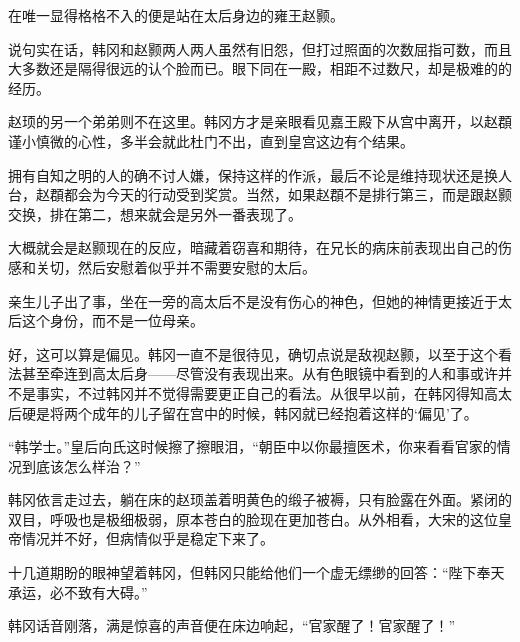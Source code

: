 在唯一显得格格不入的便是站在太后身边的雍王赵颢。

说句实在话，韩冈和赵颢两人两人虽然有旧怨，但打过照面的次数屈指可数，而且大多数还是隔得很远的认个脸而已。眼下同在一殿，相距不过数尺，却是极难的的经历。

赵顼的另一个弟弟则不在这里。韩冈方才是亲眼看见嘉王殿下从宫中离开，以赵頵谨小慎微的心性，多半会就此杜门不出，直到皇宫这边有个结果。

拥有自知之明的人的确不讨人嫌，保持这样的作派，最后不论是维持现状还是换人台，赵頵都会为今天的行动受到奖赏。当然，如果赵頵不是排行第三，而是跟赵颢交换，排在第二，想来就会是另外一番表现了。

大概就会是赵颢现在的反应，暗藏着窃喜和期待，在兄长的病床前表现出自己的伤感和关切，然后安慰着似乎并不需要安慰的太后。

亲生儿子出了事，坐在一旁的高太后不是没有伤心的神色，但她的神情更接近于太后这个身份，而不是一位母亲。

好，这可以算是偏见。韩冈一直不是很待见，确切点说是敌视赵颢，以至于这个看法甚至牵连到高太后身——尽管没有表现出来。从有色眼镜中看到的人和事或许并不是事实，不过韩冈并不觉得需要更正自己的看法。从很早以前，在韩冈得知高太后硬是将两个成年的儿子留在宫中的时候，韩冈就已经抱着这样的‘偏见’了。

“韩学士。”皇后向氏这时候擦了擦眼泪，“朝臣中以你最擅医术，你来看看官家的情况到底该怎么样治？”

韩冈依言走过去，躺在床的赵顼盖着明黄色的缎子被褥，只有脸露在外面。紧闭的双目，呼吸也是极细极弱，原本苍白的脸现在更加苍白。从外相看，大宋的这位皇帝情况并不好，但病情似乎是稳定下来了。

十几道期盼的眼神望着韩冈，但韩冈只能给他们一个虚无缥缈的回答：“陛下奉天承运，必不致有大碍。”

韩冈话音刚落，满是惊喜的声音便在床边响起，“官家醒了！官家醒了！”
